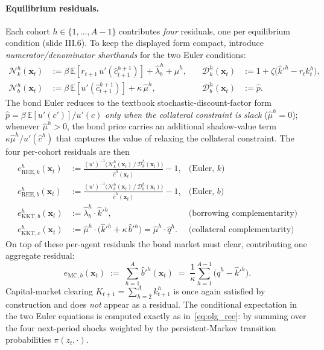 \documentclass[11pt,a4paper]{report}
\newcommand{\x}{\bm{x}}
\newcommand{\E}[1]{\mathbb{E}\!\left[#1\right]}
\begin{document}
\paragraph{Equilibrium residuals.}
Each cohort $h\in\{1,\ldots,A-1\}$ contributes \emph{four} residuals, one per equilibrium condition (slide III.6).  To keep the displayed form compact, introduce \emph{numerator/denominator shorthands} for the two Euler conditions:
\begin{equation*}
\begin{aligned}
\mathcal{N}^h_k(\x_t) &:= \beta\,\E{r_{t+1}\,u'(\hat c^{h+1}_{t+1})} + \hat\lambda_b^h + \hat\mu^h, \quad &
\mathcal{D}^h_k(\x_t) &:= 1 + \zeta\bigl(\hat k'^h - r_t k_t^h\bigr), \\[2pt]
\mathcal{N}^h_b(\x_t) &:= \beta\,\E{u'(\hat c^{h+1}_{t+1})} + \kappa\,\hat\mu^h, &
\mathcal{D}^h_b(\x_t) &:= \hat p.
\end{aligned}
\end{equation*}
The bond Euler reduces to the textbook stochastic-discount-factor form $\hat p = \beta\,\mathbb{E}[u'(c')]/u'(c)$ \emph{only when the collateral constraint is slack} ($\hat\mu^h = 0$); whenever $\hat\mu^h > 0$, the bond price carries an additional shadow-value term $\kappa\hat\mu^h/u'(\hat c^h)$ that captures the value of relaxing the collateral constraint.
The four per-cohort residuals are then
\begin{equation}
\begin{aligned}
e_{\mathrm{REE},k}^h(\x_t) &:= \frac{(u')^{-1}\bigl(\mathcal{N}^h_k(\x_t)\,/\,\mathcal{D}^h_k(\x_t)\bigr)}{\hat c^h(\x_t)} - 1, & \text{(Euler, $k$)}\\[2pt]
e_{\mathrm{REE},b}^h(\x_t) &:= \frac{(u')^{-1}\bigl(\mathcal{N}^h_b(\x_t)\,/\,\mathcal{D}^h_b(\x_t)\bigr)}{\hat c^h(\x_t)} - 1, & \text{(Euler, $b$)}\\[2pt]
e_{\mathrm{KKT},b}^h(\x_t) &:= \hat\lambda_b^h \cdot \hat k'^h, & \text{(borrowing complementarity)}\\
e_{\mathrm{KKT},c}^h(\x_t) &:= \hat\mu^h \cdot \bigl(\hat k'^h + \kappa\,\hat b'^h\bigr) = \hat\mu^h \cdot \hat q^h. & \text{(collateral complementarity)}
\end{aligned}
\label{eq:olg56_residuals}
\end{equation}
On top of these per-agent residuals the bond market must clear, contributing one aggregate residual:
\begin{equation}
e_{\mathrm{MC},b}(\x_t) \;:=\; \sum_{h=1}^{A} \hat b'^h(\x_t) \;=\; \frac{1}{\kappa}\sum_{h=1}^{A-1}\bigl(\hat q^h - \hat k'^h\bigr).
\label{eq:olg56_mc}
\end{equation}
Capital-market clearing $K_{t+1} = \sum_{h=2}^{A} k_{t+1}^h$ is once again satisfied by construction and does \emph{not} appear as a residual.  The conditional expectation in the two Euler equations is computed exactly as in~\eqref{eq:olg_ree}: by summing over the four next-period shocks weighted by the persistent-Markov transition probabilities $\pi(z_t,\cdot)$.
\end{document}
